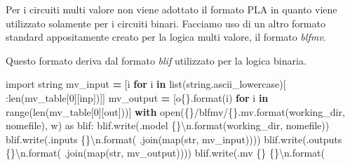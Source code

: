 \documentclass[
  italian,
]{book}
\newenvironment{Shaded}{\begin{snugshade}}{\end{snugshade}}
\newcommand{\BuiltInTok}[1]{#1}
\newcommand{\CharTok}[1]{\textcolor[rgb]{0.31,0.60,0.02}{#1}}
\newcommand{\ControlFlowTok}[1]{\textcolor[rgb]{0.13,0.29,0.53}{\textbf{#1}}}
\newcommand{\DecValTok}[1]{\textcolor[rgb]{0.00,0.00,0.81}{#1}}
\newcommand{\ImportTok}[1]{#1}
\newcommand{\KeywordTok}[1]{\textcolor[rgb]{0.13,0.29,0.53}{\textbf{#1}}}
\newcommand{\NormalTok}[1]{#1}
\newcommand{\OperatorTok}[1]{\textcolor[rgb]{0.81,0.36,0.00}{\textbf{#1}}}
\newcommand{\SpecialCharTok}[1]{\textcolor[rgb]{0.00,0.00,0.00}{#1}}
\newcommand{\StringTok}[1]{\textcolor[rgb]{0.31,0.60,0.02}{#1}}
\begin{document}
Per i circuiti multi valore non viene adottato il formato PLA in quanto viene utilizzato solamente per i circuiti binari. Facciamo uso di un altro formato standard appositamente creato per la logica multi valore, il formato \emph{blfmv}.

Questo formato deriva dal formato \emph{blif} utilizzato per la logica binaria.

\begin{Shaded}
\begin{Highlighting}[]
\ImportTok{import}\NormalTok{ string}
\NormalTok{mv\_input }\OperatorTok{=}\NormalTok{ [i }\ControlFlowTok{for}\NormalTok{ i }\KeywordTok{in} \BuiltInTok{list}\NormalTok{(string.ascii\_lowercase)[}
\NormalTok{    :}\BuiltInTok{len}\NormalTok{(mv\_table[}\DecValTok{0}\NormalTok{][}\StringTok{\textquotesingle{}inp\textquotesingle{}}\NormalTok{])]]}
\NormalTok{mv\_output }\OperatorTok{=}\NormalTok{ [}\StringTok{\textquotesingle{}o}\SpecialCharTok{\{\}}\StringTok{\textquotesingle{}}\NormalTok{.}\BuiltInTok{format}\NormalTok{(i) }\ControlFlowTok{for}\NormalTok{ i }\KeywordTok{in} \BuiltInTok{range}\NormalTok{(}\BuiltInTok{len}\NormalTok{(mv\_table[}\DecValTok{0}\NormalTok{][}\StringTok{\textquotesingle{}out\textquotesingle{}}\NormalTok{]))]}
\ControlFlowTok{with} \BuiltInTok{open}\NormalTok{(}\StringTok{\textquotesingle{}}\SpecialCharTok{\{\}}\StringTok{/blfmv/}\SpecialCharTok{\{\}}\StringTok{.mv\textquotesingle{}}\NormalTok{.}\BuiltInTok{format}\NormalTok{(working\_dir, nomefile), }\StringTok{\textquotesingle{}w\textquotesingle{}}\NormalTok{) }\ImportTok{as}\NormalTok{ blif:}
\NormalTok{    blif.write(}\StringTok{\textquotesingle{}.model }\SpecialCharTok{\{\}}\CharTok{\textbackslash{}n}\StringTok{\textquotesingle{}}\NormalTok{.}\BuiltInTok{format}\NormalTok{(working\_dir, nomefile))}
\NormalTok{    blif.write(}\StringTok{\textquotesingle{}.inputs }\SpecialCharTok{\{\}}\CharTok{\textbackslash{}n}\StringTok{\textquotesingle{}}\NormalTok{.}\BuiltInTok{format}\NormalTok{(}
        \StringTok{\textquotesingle{} \textquotesingle{}}\NormalTok{.join(}\BuiltInTok{map}\NormalTok{(}\BuiltInTok{str}\NormalTok{, mv\_input))))}
\NormalTok{    blif.write(}\StringTok{\textquotesingle{}.outputs }\SpecialCharTok{\{\}}\CharTok{\textbackslash{}n}\StringTok{\textquotesingle{}}\NormalTok{.}\BuiltInTok{format}\NormalTok{(}
        \StringTok{\textquotesingle{} \textquotesingle{}}\NormalTok{.join(}\BuiltInTok{map}\NormalTok{(}\BuiltInTok{str}\NormalTok{, mv\_output))))}
\NormalTok{    blif.write(}\StringTok{\textquotesingle{}.mv }\SpecialCharTok{\{\}}\StringTok{ }\SpecialCharTok{\{\}}\CharTok{\textbackslash{}n}\StringTok{\textquotesingle{}}\NormalTok{.}\BuiltInTok{format}\NormalTok{(}

\end{Highlighting}
\end{Shaded}
\end{document}
